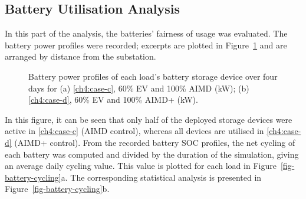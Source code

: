\subsection{Battery Utilisation Analysis}

In this part of the analysis, the batteries' fairness of usage was evaluated. The battery power profiles were recorded; excerpts are plotted in Figure~\ref{fig-battery-utilisation-power} and are arranged by distance from the substation.\vspace{-12pt}


\begin{figure}\centering
 \vspace{-3pt}
 \caption{Battery power profiles of each load's battery storage device over four days for (a) \ref{ch4:case-c}, 60\% EV and 100\% AIMD (kW); (b) \ref{ch4:case-d}, 60\% EV and 100\% AIMD+ (kW).}
 \label{fig-battery-utilisation-power}
\end{figure}

In this figure, it can be seen that only half of the deployed storage devices were active in \ref{ch4:case-c} (AIMD control), whereas all devices are utilised in \ref{ch4:case-d} (AIMD+ control). From the recorded battery SOC profiles, the net cycling of each battery was computed and divided by the duration of the simulation, giving an average daily cycling value. This value is plotted for each load in Figure~\ref{fig-battery-cycling}a. The corresponding statistical analysis is presented in Figure~\ref{fig-battery-cycling}b.\vspace{-6pt}



